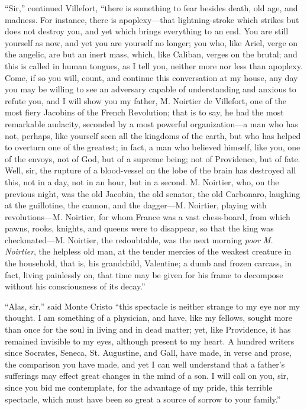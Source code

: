 “Sir,” continued Villefort, “there is something to fear besides death,
old age, and madness. For instance, there is apoplexy—that
lightning-stroke which strikes but does not destroy you, and yet which
brings everything to an end. You are still yourself as now, and yet you
are yourself no longer; you who, like Ariel, verge on the angelic, are
but an inert mass, which, like Caliban, verges on the brutal; and this
is called in human tongues, as I tell you, neither more nor less than
apoplexy. Come, if so you will, count, and continue this conversation
at my house, any day you may be willing to see an adversary capable of
understanding and anxious to refute you, and I will show you my father,
M. Noirtier de Villefort, one of the most fiery Jacobins of the French
Revolution; that is to say, he had the most remarkable audacity,
seconded by a most powerful organization—a man who has not, perhaps,
like yourself seen all the kingdoms of the earth, but who has helped to
overturn one of the greatest; in fact, a man who believed himself, like
you, one of the envoys, not of God, but of a supreme being; not of
Providence, but of fate. Well, sir, the rupture of a blood-vessel on
the lobe of the brain has destroyed all this, not in a day, not in an
hour, but in a second. M. Noirtier, who, on the previous night, was the
old Jacobin, the old senator, the old Carbonaro, laughing at the
guillotine, the cannon, and the dagger—M. Noirtier, playing with
revolutions—M. Noirtier, for whom France was a vast chess-board, from
which pawns, rooks, knights, and queens were to disappear, so that the
king was checkmated—M. Noirtier, the redoubtable, was the next morning
\textit{poor M. Noirtier}, the helpless old man, at the tender mercies of the
weakest creature in the household, that is, his grandchild, Valentine;
a dumb and frozen carcass, in fact, living painlessly on, that time may
be given for his frame to decompose without his consciousness of its
decay.”

“Alas, sir,” said Monte Cristo “this spectacle is neither strange to my
eye nor my thought. I am something of a physician, and have, like my
fellows, sought more than once for the soul in living and in dead
matter; yet, like Providence, it has remained invisible to my eyes,
although present to my heart. A hundred writers since Socrates, Seneca,
St. Augustine, and Gall, have made, in verse and prose, the comparison
you have made, and yet I can well understand that a father’s sufferings
may effect great changes in the mind of a son. I will call on you, sir,
since you bid me contemplate, for the advantage of my pride, this
terrible spectacle, which must have been so great a source of sorrow to
your family.”

